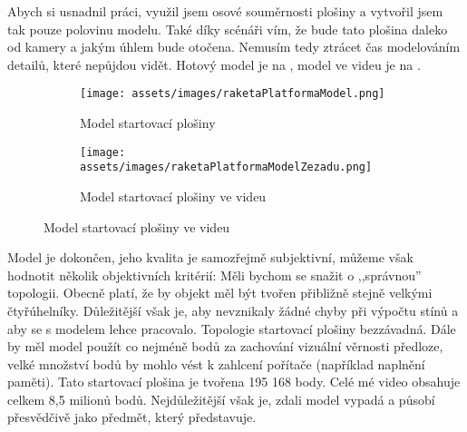 \newpage
{Abych si usnadnil práci, využil jsem osové souměrnosti plošiny a vytvořil jsem tak pouze polovinu modelu. Také díky scénáři vím, že bude tato plošina daleko od kamery a jakým úhlem bude otočena. Nemusím tedy ztrácet čas modelováním detailů, které nepůjdou vidět. Hotový model je na , model ve videu je na .}
\begin{figure}[H]
    \centering
    \begingroup
    \makeatletter
    \renewcommand\thesubfigure{\thefigure~--~\@nameuse{subfiglabel@\alph{subfigure}}}
    \newcommand{\subfiglabel@a}{vlevo}
    \newcommand{\subfiglabel@b}{vpravo}
    \captionsetup[subfigure]{labelformat=simple, labelsep=colon}
    \renewcommand\p@subfigure{}
    \makeatother
    \begin{subfigure}{.38\textwidth}
        \centering
        \texttt{[image: assets/images/raketaPlatformaModel.png]}
        \caption{Model startovací plošiny \jaObr}
        \label{obr:plosinaModel}
    \end{subfigure}
    \hfill
    \begin{subfigure}{.58\textwidth}
        \centering
        \texttt{[image: assets/images/raketaPlatformaModelZezadu.png]}
        \caption{Model startovací plošiny ve videu \jaObr}
        \label{obr:plosinaModelZezadu}
    \end{subfigure}
    \endgroup
\end{figure}
{Model je dokončen, jeho kvalita je samozřejmě subjektivní, můžeme však hodnotit několik objektivních kritérií:}\odst 
{Měli bychom se snažit o ,,správnou'' topologii. Obecně platí, že by objekt měl být tvořen přibližně stejně velkými čtyřúhelníky. Důležitější však je, aby nevznikaly žádné chyby při výpočtu stínů a aby se s modelem lehce pracovalo. Topologie startovací plošiny bezzávadná.}\odst
{Dále by měl model použít co nejméně bodů za zachování vizuální věrnosti předloze, velké množství bodů by mohlo vést k zahlcení pořítače (například naplnění paměti). Tato startovací plošina je tvořena 195 168 body. Celé mé video obsahuje celkem 8,5 milionů bodů.}\odst
{Nejdůležitější však je, zdali model vypadá a působí přesvědčivě jako předmět, který představuje.}
\newpage
